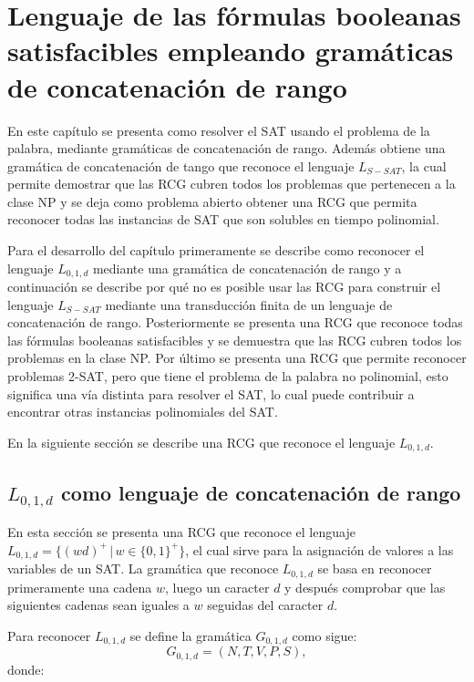 \chapter{Lenguaje de las fórmulas booleanas satisfacibles empleando gramáticas de concatenación de rango}
\label{chap:LSATRCG}


En este capítulo se presenta como resolver el SAT usando el problema de la palabra, mediante gramáticas de concatenación
de rango. Además obtiene una gramática de concatenación de tango que reconoce el lenguaje $L_{S-SAT}$, la cual permite demostrar
que las RCG cubren todos los problemas que pertenecen a la clase NP y se deja como problema abierto
obtener una RCG que permita reconocer todas las instancias de SAT que son solubles en tiempo polinomial.

Para el desarrollo del capítulo primeramente se describe como reconocer el lenguaje $L_{0,1,d}$ mediante
una gramática de concatenación de rango y a continuación se describe por qué no es posible usar las RCG
para construir el lenguaje $L_{S-SAT}$ mediante una transducción finita de un lenguaje de concatenación de rango.
Posteriormente se presenta una RCG que reconoce todas las fórmulas booleanas satisfacibles y se demuestra que
las RCG cubren todos los problemas en la clase NP. Por último se presenta una RCG que permite reconocer
problemas 2-SAT, pero que tiene el problema de la palabra no polinomial, esto significa una vía distinta
para resolver el SAT, lo cual puede contribuir a encontrar otras instancias polinomiales del SAT.

En la siguiente sección se describe una RCG que reconoce el lenguaje $L_{0,1,d}$.

\section{$L_{0,1,d}$ como lenguaje de concatenación de rango}

En esta sección se presenta una RCG que reconoce el lenguaje $L_{0,1,d}=\{(wd)^+\,|\,w\in\{0,1\}^+\}$,
el cual sirve para la asignación de valores a las variables de un SAT. La gramática que reconoce $L_{0,1,d}$
se basa en reconocer primeramente una cadena $w$, luego un caracter $d$ y después comprobar que las siguientes
cadenas sean iguales a $w$ seguidas del caracter $d$.

Para reconocer $L_{0,1,d}$ se define la gramática $G_{0,1,d}$ como sigue:
\[
    G_{0,1,d} = (N, T, V, P, S),
\]
donde:

